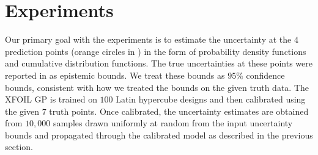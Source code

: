 \documentclass[journal]{new-aiaa}
\begin{document}
\section{Experiments}
\label{sec:experiments}
Our primary goal with the experiments is to estimate the uncertainty at the $4$ prediction points (orange circles in ) in the form of probability density functions and cumulative distribution functions. The true uncertainties at these points were reported in \citep[Figs. 2--5]{cary2026summary} as epistemic bounds. We treat these bounds as $95\%$ confidence bounds, consistent with how we treated the bounds on the given truth data. The XFOIL GP is trained on $100$ Latin hypercube designs and then calibrated using the given $7$ truth points. Once calibrated, the uncertainty estimates are obtained from $10,000$ samples drawn uniformly at random from the input uncertainty bounds and propagated through the calibrated model as described in the previous section.
\end{document}
